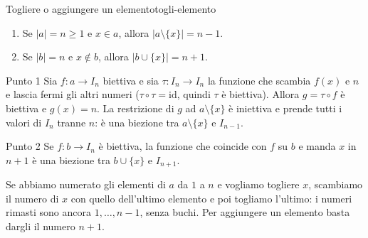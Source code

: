 \begin{concetto}
\begin{Lemma}{Togliere o aggiungere un elemento}{togli-elemento}
    \begin{prerequisiti}
    \end{prerequisiti}
    \begin{enumerate}
        \item Se $|a| = n \geq 1$ e $x \in a$, allora $|a \setminus \{x\}| = n - 1$.
        \item Se $|b| = n$ e $x \notin b$, allora $|b \cup \{x\}| = n + 1$.
    \end{enumerate}
\end{Lemma}
\begin{dimostrazione}
    \begin{caso}{Punto 1}
        Sia $f \colon a \to I_n$ biettiva e sia $\tau \colon I_n \to I_n$ la funzione che scambia $f(x)$ e $n$ e lascia fermi gli altri numeri
        ($\tau \circ \tau = \mathrm{id}$, quindi $\tau$ è biettiva). Allora $g = \tau \circ f$ è biettiva e $g(x) = n$. La restrizione di $g$ ad
        $a \setminus \{x\}$ è iniettiva e prende tutti i valori di $I_n$ tranne $n$: è una biezione tra $a \setminus \{x\}$ e $I_{n - 1}$.
    \end{caso}
    \begin{caso}{Punto 2}
        Se $f \colon b \to I_n$ è biettiva, la funzione che coincide con $f$ su $b$ e manda $x$ in $n + 1$ è una biezione tra $b \cup \{x\}$ e $I_{n + 1}$.
    \end{caso}
\end{dimostrazione}
\end{concetto}

\begin{spiegazione}
    Se abbiamo numerato gli elementi di $a$ da $1$ a $n$ e vogliamo togliere $x$, scambiamo il numero di $x$ con quello
    dell'ultimo elemento e poi togliamo l'ultimo: i numeri rimasti sono ancora $1, \dots, n - 1$, senza buchi. Per aggiungere un
    elemento basta dargli il numero $n + 1$.
\end{spiegazione}

